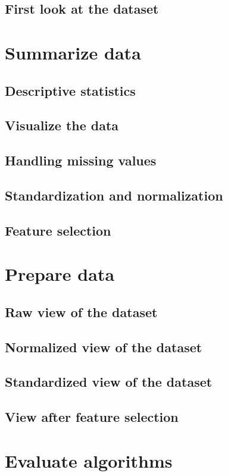 \section{First look at the dataset}

\chapter{Summarize data}

\section{Descriptive statistics}
\section{Visualize the data}
\section{Handling missing values}
\section{Standardization and normalization}
\section{Feature selection}

\chapter{Prepare data}

\section{Raw view of the dataset}
\section{Normalized view of the dataset}
\section{Standardized view of the dataset}
\section{View after feature selection}

\chapter{Evaluate algorithms}

